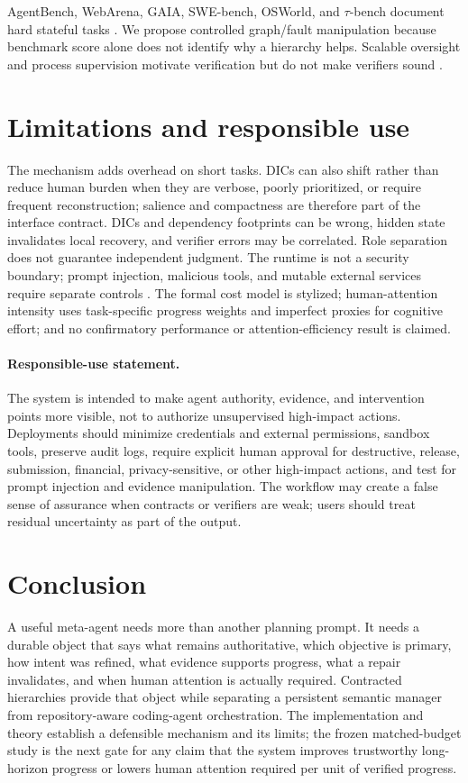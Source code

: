 \documentclass{article}
\begin{document}
AgentBench, WebArena, GAIA, SWE-bench, OSWorld, and $\tau$-bench document hard stateful tasks \citep{liu2024agentbench,zhou2024webarena,mialon2024gaia,jimenez2024swebench,xie2024osworld,yao2024taubench}. We propose controlled graph/fault manipulation because benchmark score alone does not identify why a hierarchy helps. Scalable oversight and process supervision motivate verification but do not make verifiers sound \citep{lightman2023verify,irving2018debate,leike2018recursive}.

\section{Limitations and responsible use}
The mechanism adds overhead on short tasks. DICs can also shift rather than reduce human burden when they are verbose, poorly prioritized, or require frequent reconstruction; salience and compactness are therefore part of the interface contract. DICs and dependency footprints can be wrong, hidden state invalidates local recovery, and verifier errors may be correlated. Role separation does not guarantee independent judgment. The runtime is not a security boundary; prompt injection, malicious tools, and mutable external services require separate controls \citep{ruan2024toolemu,debenedetti2024agentdojo}. The formal cost model is stylized; human-attention intensity uses task-specific progress weights and imperfect proxies for cognitive effort; and no confirmatory performance or attention-efficiency result is claimed.

\paragraph{Responsible-use statement.} The system is intended to make agent authority, evidence, and intervention points more visible, not to authorize unsupervised high-impact actions. Deployments should minimize credentials and external permissions, sandbox tools, preserve audit logs, require explicit human approval for destructive, release, submission, financial, privacy-sensitive, or other high-impact actions, and test for prompt injection and evidence manipulation. The workflow may create a false sense of assurance when contracts or verifiers are weak; users should treat residual uncertainty as part of the output.

\section{Conclusion}
A useful meta-agent needs more than another planning prompt. It needs a durable object that says what remains authoritative, which objective is primary, how intent was refined, what evidence supports progress, what a repair invalidates, and when human attention is actually required. Contracted hierarchies provide that object while separating a persistent semantic manager from repository-aware coding-agent orchestration. The implementation and theory establish a defensible mechanism and its limits; the frozen matched-budget study is the next gate for any claim that the system improves trustworthy long-horizon progress or lowers human attention required per unit of verified progress.



\end{document}
